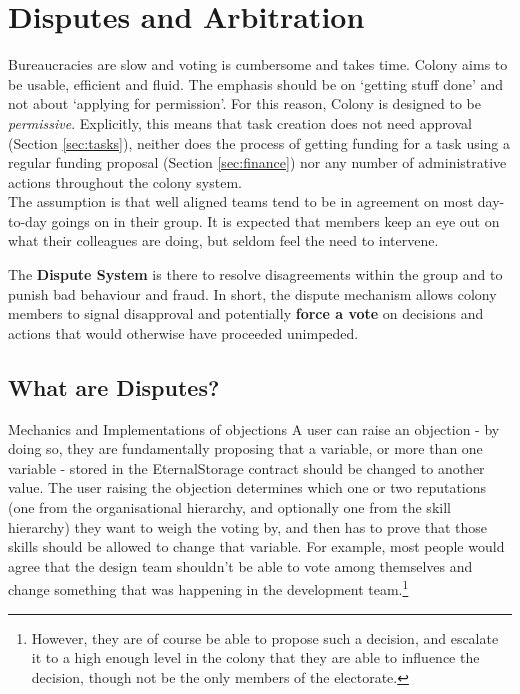 \section{Disputes and Arbitration}\label{sec:disputes}
Bureaucracies are slow and voting is cumbersome and takes time. Colony aims to be usable, efficient and fluid. The emphasis should be on `getting stuff done' and not about `applying for permission'. For this reason, Colony is designed to be \emph{permissive}. Explicitly, this means that task creation does not need approval (Section \ref{sec:tasks}), neither does the process of getting funding for a task using a regular funding proposal (Section \ref{sec:finance}) nor any number of administrative actions throughout the colony system.\\
The assumption is that well aligned teams tend to be in agreement on most day-to-day goings on in their group. It is expected that members keep an eye out on what their colleagues are doing, but seldom feel the need to intervene. 

The \textbf{Dispute System} is there to resolve disagreements within the group and to punish bad behaviour and fraud. In short, the dispute mechanism allows colony members to signal disapproval and potentially \textbf{force a vote} on decisions and actions that would otherwise have proceeded unimpeded.


\subsection{What are Disputes?}


Mechanics and Implementations of objections
A user can raise an objection - by doing so, they are fundamentally proposing that a variable, or more than one variable - stored in the EternalStorage contract should be changed to another value. The user raising the objection determines which one or two reputations (one from the organisational hierarchy, and optionally one from the skill hierarchy) they want to weigh the voting by, and then has to prove that those skills should be allowed to change that variable. For example, most people would agree that the design team shouldn't be able to vote among themselves and change something that was happening in the development team.\footnote{However, they are of course be able to propose such a decision, and escalate it to a high enough level in the colony that they are able to influence the decision, though not be the only members of the electorate.}

